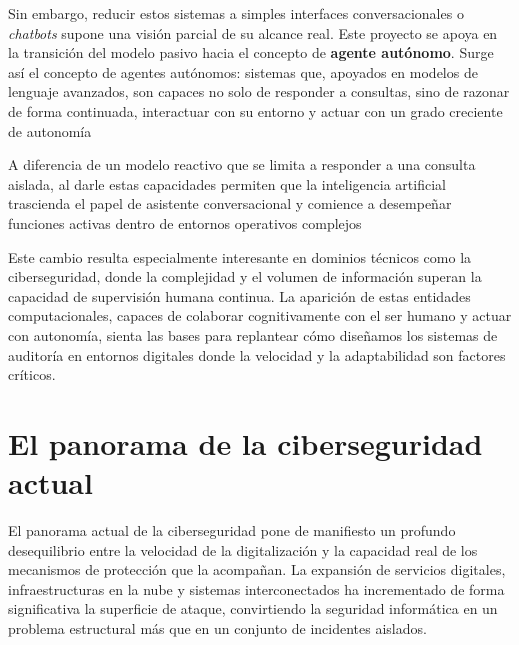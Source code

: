 Sin embargo, reducir estos sistemas a simples interfaces conversacionales o \textit{chatbots} supone una visión parcial de su alcance real. Este proyecto se apoya en la transición del modelo pasivo hacia el concepto de \textbf{agente autónomo}. \cite{park2023generative} Surge así el concepto de agentes autónomos: sistemas que, apoyados en modelos de lenguaje avanzados, son capaces no solo de responder a consultas, sino de razonar de forma continuada, interactuar con su entorno y actuar con un grado creciente de autonomía \cite{wang2024survey_agents}

A diferencia de un modelo reactivo que se limita a responder a una consulta aislada, al darle estas capacidades permiten que la inteligencia artificial trascienda el papel de asistente conversacional y comience a desempeñar funciones activas dentro de entornos operativos complejos

Este cambio resulta especialmente interesante en dominios técnicos como la ciberseguridad, donde la complejidad y el volumen de información superan la capacidad de supervisión humana continua. La aparición de estas entidades computacionales, capaces de colaborar cognitivamente con el ser humano y actuar con autonomía, sienta las bases para replantear cómo diseñamos los sistemas de auditoría en entornos digitales donde la velocidad y la adaptabilidad son factores críticos.

\section{El panorama de la ciberseguridad actual}
El panorama actual de la ciberseguridad pone de manifiesto un profundo desequilibrio entre la velocidad de la digitalización y la capacidad real de los mecanismos de protección que la acompañan. La expansión de servicios digitales, infraestructuras en la nube y sistemas interconectados ha incrementado de forma significativa la superficie de ataque, \cite{cyber_gap_2023} convirtiendo la seguridad informática en un problema estructural más que en un conjunto de incidentes aislados.


